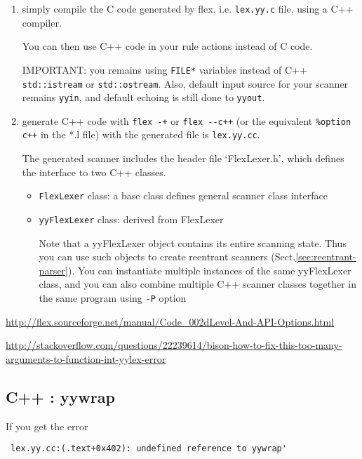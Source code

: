 \begin{enumerate}

  \item simply compile the C code generated by flex, i.e. \verb!lex.yy.c!
  file, using a C++ compiler.
  
  You can then use C++ code in your rule actions instead of C code.
  
  IMPORTANT: you remains using \verb!FILE*! variables instead of C++
  \verb!std::istream! or \verb!std::ostream!. Also, default input source for
  your scanner remains \verb!yyin!, and default echoing is still done to \verb!yyout!.
  
  \item generate C++ code with \verb!flex -+! or \verb!flex --c++! (or the
  equivalent \verb!%option c++! in the *.l file) with the generated file is
  \verb!lex.yy.cc!.
  
  The generated scanner includes the header file `FlexLexer.h', which defines
  the interface to two C++ classes. 
  \begin{itemize}
    \item \verb!FlexLexer! class: a base class defines general scanner class
    interface
    
    \item \verb!yyFlexLexer! class: derived from FlexLexer
    
    Note that a yyFlexLexer object contains its entire scanning state. Thus you
    can use such objects to create reentrant scanners
    (Sect.\ref{sec:reentrant-parser}).
    You can instantiate multiple instances of the same yyFlexLexer class, and
    you can also combine multiple C++ scanner classes together in the same program
    using \verb!-P! option
  \end{itemize}

\end{enumerate}
\url{http://flex.sourceforge.net/manual/Code_002dLevel-And-API-Options.html}

\url{http://stackoverflow.com/questions/22239614/bison-how-to-fix-this-too-many-arguments-to-function-int-yylex-error}

\subsection{C++ : yywrap}
\label{sec:yywrap_C++}

If you get the error
\begin{verbatim}
 lex.yy.cc:(.text+0x402): undefined reference to yywrap'
\end{verbatim}

